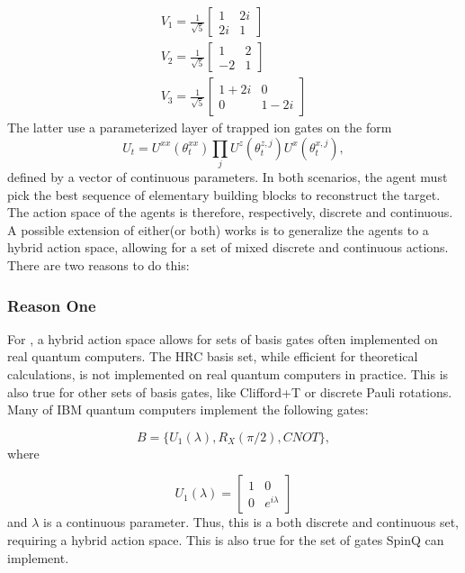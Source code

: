 \documentclass{article}
\begin{document}
\begin{align*}
    V_1 = 
    \frac{1}{\sqrt{5}}
    \begin{bmatrix}
    1 & 2i\\
    2i & 1
\end{bmatrix}\\
V_2 = 
\frac{1}{\sqrt{5}}
\begin{bmatrix}
    1 & 2\\
    -2 & 1
\end{bmatrix}\\
V_3 = 
\frac{1}{\sqrt{5}}
\begin{bmatrix}
    1 +2i & 0\\
    0 & 1 - 2i
\end{bmatrix}
\end{align*}
The latter use a parameterized layer of trapped ion gates on the form
\begin{equation}\label{eq:layer}
    U_t = U^{xx}(\theta^{xx}_t)\prod_{j}{U^{z}(\theta^{z,j}_t)U^{x}(\theta^{x,j}_t)},
\end{equation}
defined by a vector of continuous parameters. In both scenarios, the agent must pick the best sequence of elementary building blocks to reconstruct the target. The action space of the agents is therefore, respectively, discrete and continuous. A possible extension of either(or both) works is to generalize the agents to a hybrid action space, allowing for a set of mixed discrete and continuous actions. There are two reasons to do this:
\subsubsection*{Reason One}
For \cite{QuantumComp}, a hybrid action space allows for sets of basis gates often implemented on real quantum computers. The HRC basis set, while efficient for theoretical calculations, is not implemented on real quantum computers in practice. This is also true for other sets of basis gates, like Clifford+T or discrete Pauli rotations. Many of IBM quantum computers implement the following gates\cite{j2020quantum}:

\begin{equation*}
    B = \{U_1(\lambda), R_X(\pi/2), CNOT\},
\end{equation*}
where

\begin{equation*}
    U_1(\lambda) = 
    \begin{bmatrix}
    1 & 0\\
    0 & e^{i\lambda}
    \end{bmatrix}
\end{equation*}
and $\lambda$ is a continuous parameter. Thus, this is a both discrete and continuous set, requiring a hybrid action space. This is also true for the set of gates SpinQ can implement.  
\end{document}

